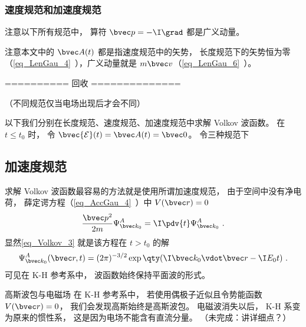 
\subsubsection{速度规范和加速度规范}
注意以下所有规范中， 算符 $\bvec p = -\I \grad$ 都是广义动量。

注意本文中的 $\bvec A(t)$ 都是指速度规范中的矢势， 长度规范下的矢势恒为零（\autoref{eq_LenGau_4}~），广义动量就是 $m\bvec v$（\autoref{eq_LenGau_6}~）。

========== 回收 ==============


（不同规范仅当电场出现后才会不同）

以下我们分别在长度规范、速度规范、加速度规范中求解 Volkov 波函数。 在 $t \le t_0$ 时， 令 $\bvec {\mathcal E}(t) = \bvec A(t) = \bvec 0$。 令三种规范下 




\subsection{加速度规范}
求解 Volkov 波函数最容易的方法就是使用所谓加速度规范， 由于空间中没有净电荷， 薛定谔方程（\autoref{eq_AccGau_4}~）中 $V(\bvec r) = 0$
\begin{equation}
\frac{\bvec p^2}{2m}\Psi_{\bvec k_0}^A = \I \pdv{t} \Psi_{\bvec k_0}^A~.
\end{equation}
显然\autoref{eq_Volkov_3} 就是该方程在 $t > t_0$ 的解
\begin{equation}\label{eq_Volkov_2}
\Psi_{\bvec k_0}^A(\bvec r, t) = (2\pi)^{-3/2} \exp\qty(\I\bvec k_0 \vdot \bvec r - \I E_0 t)~.
\end{equation}
可见在 K-H 参考系中， 波函数始终保持平面波的形式。

\begin{example}{高斯波包与电磁场}
在 K-H 参考系中， 若使用偶极子近似且令势能函数 $V(\bvec r) = 0$， 我们会发现高斯始终是高斯波包。 电磁波消失以后， K-H 系变为原来的惯性系， 这是因为电场不能含有直流分量。 （未完成：讲详细点？）
\end{example}

